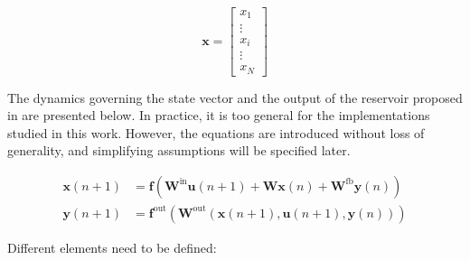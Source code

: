 \begin{equation}
	\mathbf{x} = \begin{bmatrix}
		x_1\\
		\vdots \\
		x_i \\
		\vdots \\
		x_N
	\end{bmatrix}
\end{equation}

\newpage

The dynamics governing the state vector and the output of the reservoir proposed in \cite{JaegerH.2001Tesa} are presented below. In practice, it is too general for the implementations studied in this work. However, the equations are introduced without loss of generality, and simplifying assumptions will be specified later.

\begin{align}
	\mathbf{x}(n+1) &= \mathbf{f} \left( \mathbf{W}^{\text{in}} \mathbf{u}(n+1) + \mathbf{W} \mathbf{x}(n) + \mathbf{W}^{\text{fb}} \mathbf{y}(n) \right) \label{rc_dynamics}\\
	\mathbf{y}(n+1) &= \mathbf{f}^{\text{out}} \left( \mathbf{W}^{\text{out}} \left(\mathbf{x}(n+1), \mathbf{u}(n+1), \mathbf{y}(n)\right) \right) \label{rc_output}
\end{align}

Different elements need to be defined: 

